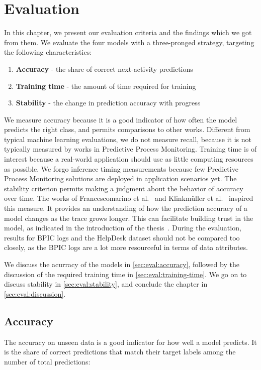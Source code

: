 \chapter{Evaluation}\label{chap:evaluation}
In this chapter, we present our evaluation criteria and the findings which we got from them.
We evaluate the four models with a three-pronged strategy, targeting the following characteristics:

\begin{enumerate}
    \item\textbf{Accuracy} - the share of correct next-activity predictions
    \item\textbf{Training time} - the amount of time required for training
    \item\textbf{Stability} - the change in prediction accuracy with progress
\end{enumerate}

We measure accuracy because it is a good indicator of how often the model predicts the right class, and permits comparisons to other works.
Different from typical machine learning evaluations, we do not measure recall, because it is not typically measured by works in Predictive Process Monitoring.
Training time is of interest because a real-world application should use as little computing resources as possible.
We forgo inference timing measurements because few Predictive Process Monitoring solutions are deployed in application scenarios yet.
The stability criterion permits making a judgment about the behavior of accuracy over time. The works of Francescomarino et al.~\cite{francescomarino2015} and Klinkmüller et al.~\cite{klinkmuller2018reliablemonitoring} inspired this measure. It provides an understanding of how the prediction accuracy of a model changes as the trace grows longer. This can facilitate building trust in the model, as indicated in the introduction of the thesis~\cite{klinkmuller2018reliablemonitoring, boehmer2018probability}.
During the evaluation, results for BPIC logs and the HelpDesk dataset should not be compared too closely, as the BPIC logs are a lot more resourceful in terms of data attributes.

We discuss the acurracy of the models in \autoref{sec:eval:accuracy}, followed by the discussion of the required training time in \autoref{sec:eval:training-time}. We go on to discuss stability in \autoref{sec:eval:stability}, and conclude the chapter in \autoref{sec:eval:discussion}.

\section{Accuracy}\label{sec:eval:accuracy}
The accuracy on unseen data is a good indicator for how well a model predicts.
It is the share of correct predictions that match their target labels among the number of total predictions:

